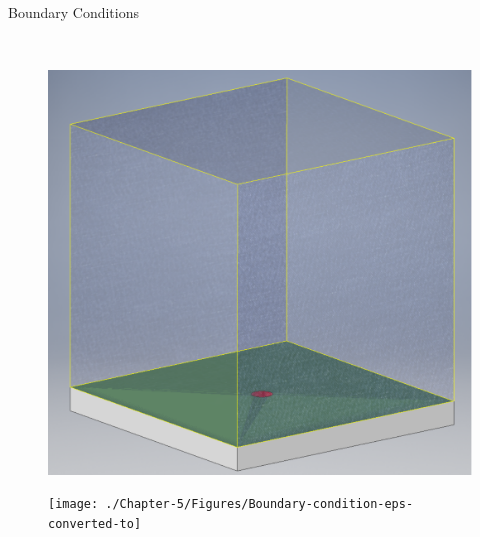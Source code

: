 \documentclass{beamer}
\begin{document}
\begin{frame}{Boundary Conditions}
\begin{minipage}{.560\textwidth}
%
\\[20mm]
%
\begin{minipage}{0.49\textwidth}
\begin{figure}[!t]
\centering
\includegraphics[width=.99\textwidth]{./Chapter-2/Figures/Domain_good}
\label{fig:Domain_3D}
\end{figure}
\end{minipage}
\begin{minipage}{0.49\textwidth}
\begin{figure}[!t]
\centering
\texttt{[image: ./Chapter-5/Figures/Boundary-condition-eps-converted-to]}
\end{figure}
\end{minipage}
%
\end{minipage}
%
\end{frame}
\end{document}
